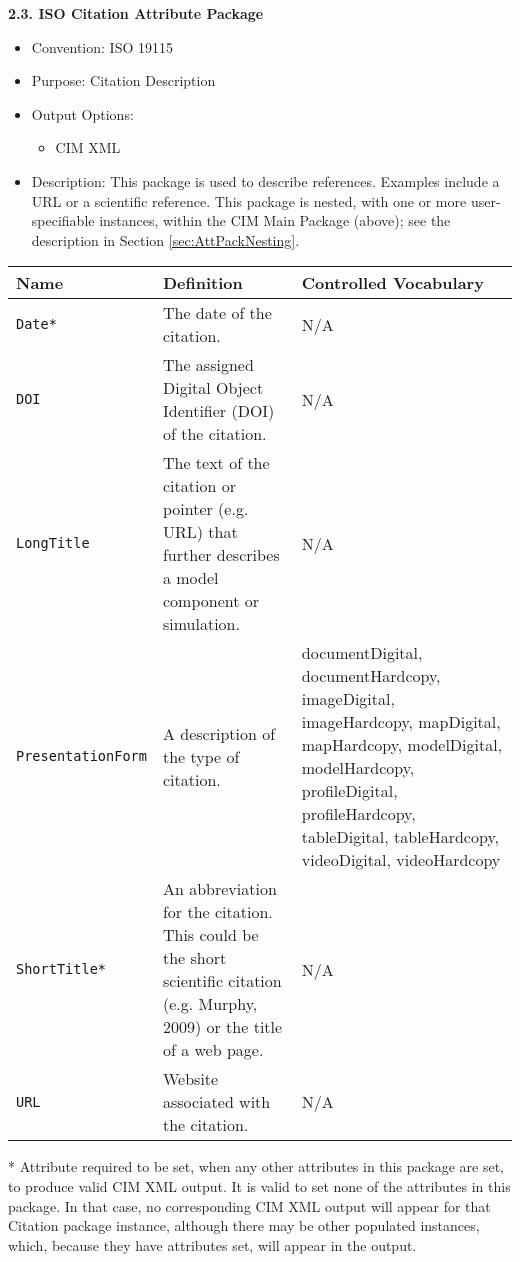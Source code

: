 {\bf 2.3. ISO Citation Attribute Package}

\begin{itemize}
    \item Convention: ISO 19115
    \item Purpose: Citation Description
    \item Output Options: 
    \begin{itemize}
        \item CIM XML 
    \end{itemize} 
    \item Description: This package is used to describe references. Examples include a URL or a scientific reference.  This package is nested, with one or more user-specifiable instances, within the CIM Main Package (above); see the description in Section \ref{sec:AttPackNesting}.
\end{itemize}


\begin{tabular}{|p{5cm}|p{5cm}|p{4cm}|}
     \hline\hline
     {\bf Name } & {\bf Definition} & {\bf Controlled Vocabulary} \\
     \hline\hline
     {\tt Date*} & The date of the citation. & N/A\\
     {\tt DOI} & The assigned Digital Object Identifier (DOI) of the citation. & N/A\\
     {\tt LongTitle} & The text of the citation or pointer (e.g. URL) that further describes a model component or simulation. & N/A\\
     {\tt PresentationForm} & A description of the type of citation. & documentDigital, documentHardcopy, imageDigital, imageHardcopy, mapDigital, mapHardcopy, modelDigital, modelHardcopy, profileDigital, profileHardcopy, tableDigital, tableHardcopy, videoDigital, videoHardcopy\\
     {\tt ShortTitle*} & An abbreviation for the citation.  This could be the short scientific citation (e.g. Murphy, 2009) or the title of a web page. & N/A \\     {\tt URL} & Website associated with the citation. & N/A\\
     \hline\hline
\end{tabular}
\linebreak
* Attribute required to be set, when any other attributes in this package are set, to produce valid CIM XML output. It is valid to set none of the attributes in this package. In that case, no corresponding CIM XML output will appear for that Citation package instance, although there may be other populated instances, which, because they have attributes set, will appear in the output. \\

